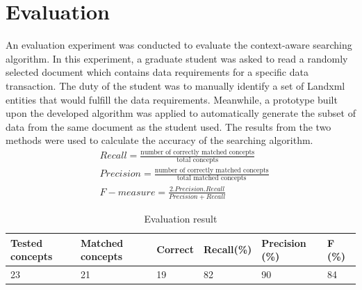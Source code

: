 \documentclass[Journal, InsideFigs, DoubleSpace]{ascelike} %
\begin{document}
\section{Evaluation} \label{sec:val}
An evaluation experiment was conducted to evaluate the context-aware searching algorithm. In this experiment, a graduate student was asked to read a randomly selected document which contains data requirements for a specific data transaction. The duty of the student was to manually identify a set of Landxml entities that would fulfill the data requirements. Meanwhile, a prototype built upon the developed algorithm was applied to automatically generate the subset of data from the same document as the student used. The results from the two methods were used to calculate the accuracy of the searching algorithm.
%
\begin{align} 
&Recall = \frac{\text{number of correctly matched concepts}}{\text{total concepts}}  \\ 
&Precision = \frac{\text{number of correctly matched concepts}}{\text{total matched concepts}}  \\
&F-measure = \frac{2.Precision.Recall}{Precision+Recall}
\end{align}
%
\begin{table} [b] 
\caption{Evaluation result}
\label{table:eva}
\centering
\small
\renewcommand{\arraystretch}{1.25}
\begin{tabular}{l l l l l l}


\hline
\hline
 Tested concepts & Matched concepts & Correct & Recall(\%) & Precision (\%) & F (\%)\\
 \hline
23 & 21 & 19 & 82 & 90 & 84\\


\hline
\hline
\end{tabular}
\normalsize
\end{table}
\end{document}
